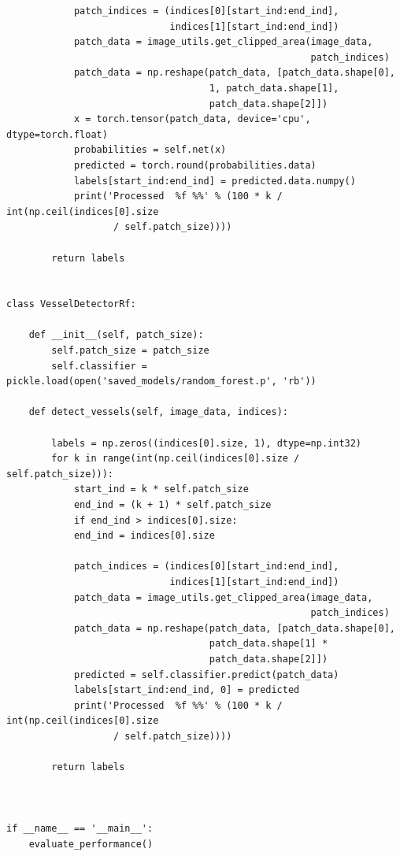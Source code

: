 \documentclass[aps,prb,10pt,twocolumn,groupedaddress]{revtex4-1}
\begin{document}
\begin{lstlisting}
			patch_indices = (indices[0][start_ind:end_ind], 
			                 indices[1][start_ind:end_ind])
			patch_data = image_utils.get_clipped_area(image_data, 
			                                          patch_indices)
			patch_data = np.reshape(patch_data, [patch_data.shape[0],
			                        1, patch_data.shape[1],
			                        patch_data.shape[2]])
			x = torch.tensor(patch_data, device='cpu', dtype=torch.float)
			probabilities = self.net(x)
			predicted = torch.round(probabilities.data)
			labels[start_ind:end_ind] = predicted.data.numpy()
			print('Processed  %f %%' % (100 * k / int(np.ceil(indices[0].size
			       / self.patch_size))))

		return labels


class VesselDetectorRf:

	def __init__(self, patch_size):
		self.patch_size = patch_size
		self.classifier = pickle.load(open('saved_models/random_forest.p', 'rb'))

	def detect_vessels(self, image_data, indices):

		labels = np.zeros((indices[0].size, 1), dtype=np.int32)
		for k in range(int(np.ceil(indices[0].size / self.patch_size))):
			start_ind = k * self.patch_size
			end_ind = (k + 1) * self.patch_size
			if end_ind > indices[0].size:
			end_ind = indices[0].size

			patch_indices = (indices[0][start_ind:end_ind], 
			                 indices[1][start_ind:end_ind])
			patch_data = image_utils.get_clipped_area(image_data,
										              patch_indices)
			patch_data = np.reshape(patch_data, [patch_data.shape[0], 
			                        patch_data.shape[1] *  
			                        patch_data.shape[2]])
			predicted = self.classifier.predict(patch_data)
			labels[start_ind:end_ind, 0] = predicted
			print('Processed  %f %%' % (100 * k / int(np.ceil(indices[0].size
			       / self.patch_size))))

		return labels



if __name__ == '__main__':
	evaluate_performance()
\end{lstlisting}
\end{document}
